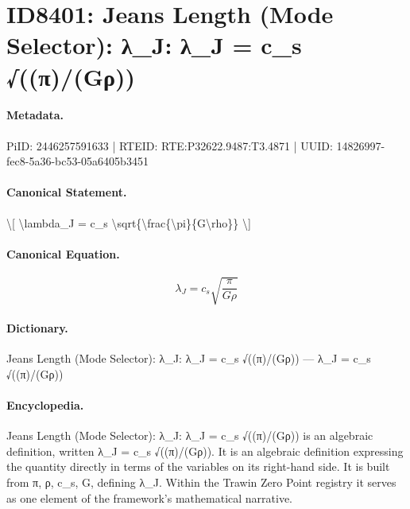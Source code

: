 \section*{ID8401: Jeans Length (Mode Selector): λ\_J: λ\_J = c\_s √((π)/(Gρ))}
\paragraph{Metadata.}
PiID: 2446257591633 | RTEID: RTE:P32622.9487:T3.4871 | UUID: 14826997-fec8-5a36-bc53-05a6405b3451

\paragraph{Canonical Statement.}
\textbackslash{}[ \textbackslash{}lambda\_J = c\_s \textbackslash{}sqrt\{\textbackslash{}frac\{\textbackslash{}pi\}\{G\textbackslash{}rho\}\} \textbackslash{}]

\paragraph{Canonical Equation.}
\[
\lambda_J = c_s \sqrt{\frac{\pi}{G\rho}}
\]

\paragraph{Dictionary.}
Jeans Length (Mode Selector): λ\_J: λ\_J = c\_s √((π)/(Gρ)) — λ\_J = c\_s √((π)/(Gρ))

\paragraph{Encyclopedia.}
Jeans Length (Mode Selector): λ\_J: λ\_J = c\_s √((π)/(Gρ)) is an algebraic definition, written λ\_J = c\_s √((π)/(Gρ)). It is an algebraic definition expressing the quantity directly in terms of the variables on its right-hand side. It is built from π, ρ, c\_s, G, defining λ\_J. Within the Trawin Zero Point registry it serves as one element of the framework's mathematical narrative.
